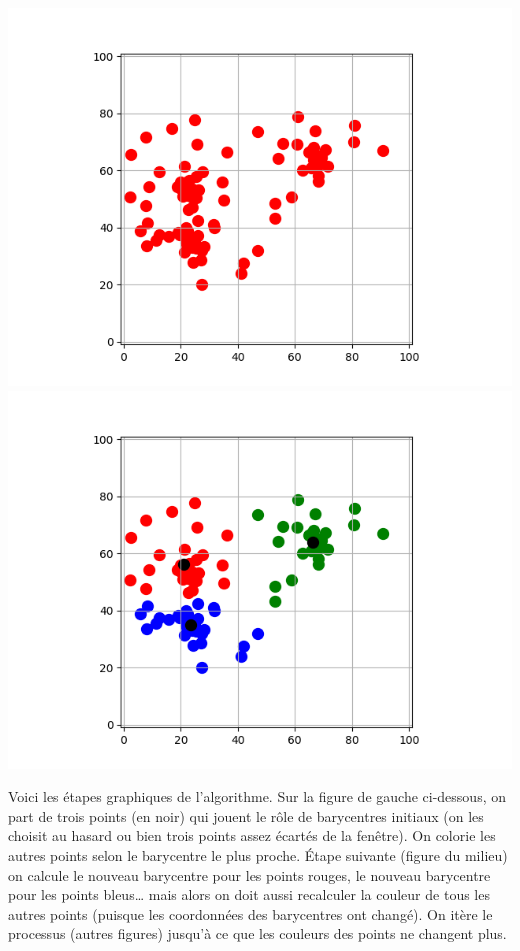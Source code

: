 \documentclass[10pt,class=report,crop=false]{standalone}
\begin{document}
\begin{activite}[Barycentres]
\begin{enumerate}
	\begin{center}
		\includegraphics[scale=\myscale,scale=0.5]{ecran_barycentres_exemple_01}\quad
		\includegraphics[scale=\myscale,scale=0.5]{ecran_barycentres_exemple_10}
	\end{center}	
	
	Voici les étapes graphiques de l'algorithme. Sur la figure de gauche ci-dessous, on part de trois points (en noir) qui jouent le rôle de barycentres initiaux (on les choisit au hasard ou bien trois points assez écartés de la fenêtre).
	On colorie les autres points selon le barycentre le plus proche. \'Etape suivante (figure du milieu) on calcule le nouveau barycentre pour les points rouges, le nouveau barycentre  pour les points bleus\ldots{} mais alors on doit aussi recalculer la couleur de tous les autres points (puisque les coordonnées des barycentres ont changé). On itère le processus (autres figures) jusqu'à ce que les couleurs des points ne changent plus.
	 


\end{enumerate}
\end{activite}
\end{document}
